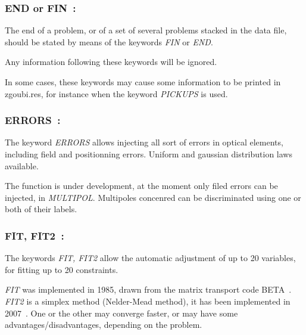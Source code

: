 \newpage

\subsubsection*{END or FIN~: \ENDTitl}  \label{FIN}  \label{END} 
\medskip

The end of a problem, or of a set of several problems stacked in 
the data file, should be stated by means of the keywords \textsl{FIN} or
\textsl{END}.  

\bigskip

\noindent Any information following these keywords will be ignored. 

\bigskip

\noindent In some cases, these keywords may cause some information to be  printed in zgoubi.res, for instance when the 
keyword \textsl{PICKUPS} is used. 




\newpage

\subsubsection*{ERRORS~:  \ERRORSTitl}  \label{ERRORS}   
\medskip

 The keyword \textsl{ERRORS} allows injecting all sort of errors in optical elements, 
including field and positionning errors. Uniform and gaussian distribution laws available. 

\medskip 

 \noindent The function is under development, at the moment only filed errors can be injected, 
in \textsl{MULTIPOL}. Multipoles concenred can be discriminated using one or both of their 
labels.





\newpage

\subsubsection*{FIT, FIT2~:  \FITTitl}  \label{FIT}   
\medskip

 The keywords \textsl{FIT, FIT2} allow the automatic adjustment of up to 20 
variables, for fitting up to 20 constraints. 

\medskip 

 \noindent 
\textsl{FIT} was implemented in 1985, drawn from  the matrix transport code BETA~\cite{Biblio10}. 
\textsl{FIT2} is a simplex method (Nelder-Mead method), it has been implemented  in 2007~\cite{NelderMead}.   
One or the other may converge 
faster, or may have some advantages/disadvantages,  depending on the problem. 

